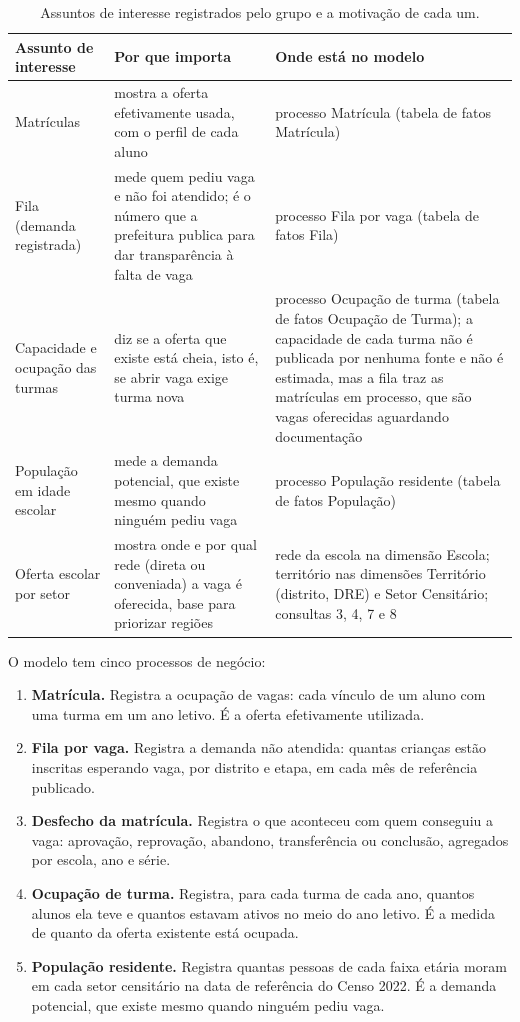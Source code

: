 \documentclass[11pt,a4paper]{article}
\begin{document}
\begin{table}[H]
\centering\small
\begin{tabularx}{\linewidth}{>{\raggedright}p{2.9cm}>{\raggedright}X>{\raggedright\arraybackslash}X}
\toprule
\textbf{Assunto de interesse} & \textbf{Por que importa} & \textbf{Onde está no modelo} \\
\midrule
Matrículas & mostra a oferta efetivamente usada, com o perfil de cada aluno & processo Matrícula (tabela de fatos Matrícula) \\
Fila (demanda registrada) & mede quem pediu vaga e não foi atendido; é o número que a prefeitura publica para dar transparência à falta de vaga & processo Fila por vaga (tabela de fatos Fila) \\
Capacidade e ocupação das turmas & diz se a oferta que existe está cheia, isto é, se abrir vaga exige turma nova & processo Ocupação de turma (tabela de fatos Ocupação de Turma); a capacidade de cada turma não é publicada por nenhuma fonte e não é estimada, mas a fila traz as matrículas em processo, que são vagas oferecidas aguardando documentação \\
População em idade escolar & mede a demanda potencial, que existe mesmo quando ninguém pediu vaga & processo População residente (tabela de fatos População) \\
Oferta escolar por setor & mostra onde e por qual rede (direta ou conveniada) a vaga é oferecida, base para priorizar regiões & rede da escola na dimensão Escola; território nas dimensões Território (distrito, DRE) e Setor Censitário; consultas 3, 4, 7 e 8 \\
\bottomrule
\end{tabularx}
\caption{Assuntos de interesse registrados pelo grupo e a motivação de cada um.}
\label{tab:assuntos}
\end{table}

O modelo tem cinco processos de negócio:

\begin{enumerate}
\item \textbf{Matrícula.} Registra a ocupação de vagas: cada vínculo de um aluno com uma turma em um ano letivo. É a oferta efetivamente utilizada.
\item \textbf{Fila por vaga.} Registra a demanda não atendida: quantas crianças estão inscritas esperando vaga, por distrito e etapa, em cada mês de referência publicado.
\item \textbf{Desfecho da matrícula.} Registra o que aconteceu com quem conseguiu a vaga: aprovação, reprovação, abandono, transferência ou conclusão, agregados por escola, ano e série.
\item \textbf{Ocupação de turma.} Registra, para cada turma de cada ano, quantos alunos ela teve e quantos estavam ativos no meio do ano letivo. É a medida de quanto da oferta existente está ocupada.
\item \textbf{População residente.} Registra quantas pessoas de cada faixa etária moram em cada setor censitário na data de referência do Censo 2022. É a demanda potencial, que existe mesmo quando ninguém pediu vaga.
\end{enumerate}
\end{document}
